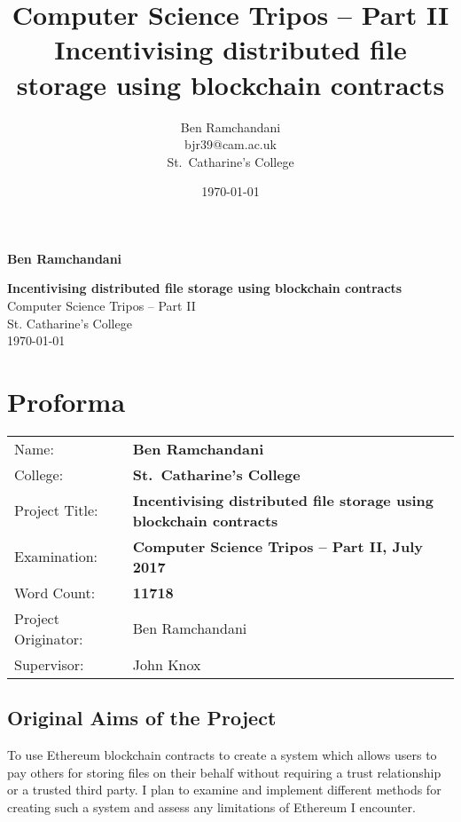 \documentclass[12pt,a4paper,twoside,openright]{report}
\title{
{\Large Computer Science Tripos -- Part II}\\
\vspace{1em}
Incentivising distributed file storage using blockchain contracts}
\author{Ben Ramchandani \\ bjr39@cam.ac.uk \\ St.\ Catharine's College}
\date{\today}
\begin{document}
\begin{titlepage}
\hfill \textbf{\Large Ben Ramchandani}
\vspace{10em}
\begin{center}
{\huge \bfseries Incentivising distributed file storage using blockchain contracts}\\
\vspace{2em}
{\Large Computer Science Tripos -- Part II}\\
\vspace{2em}
{\Large St. Catharine's College}\\
\vspace{2em}
{\Large \today}
\end{center}
\end{titlepage}

\chapter*{Proforma}
\vspace{-1em}
{
\begin{tabular}{ll}
Name:               & \bf Ben Ramchandani\\
College:            & \bf St.\ Catharine's College\\
Project Title:      & \bf Incentivising distributed file storage using blockchain contracts\\
Examination:        & \bf Computer Science Tripos -- Part II, July 2017  \\
Word Count:         & \bf 11718\footnotemark[1]\\
Project Originator: & Ben Ramchandani\\
Supervisor:         & John Knox\\ 
\end{tabular}
}
\vspace{-0.5em}
\section*{Original Aims of the Project}
\vspace{-0.3em}
To use Ethereum blockchain contracts 
to create a system which allows users to pay others for storing files on their behalf without requiring a trust relationship or a trusted third party.
I plan to examine and implement different methods for creating such a system and assess any limitations of Ethereum I encounter.
\vspace{-0.3em}
\end{document}

